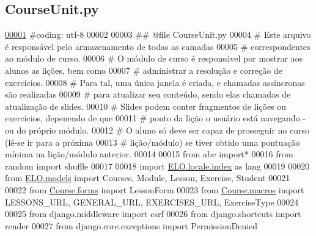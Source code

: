 \hypertarget{CourseUnit_8py_source}{}\subsection{Course\+Unit.\+py}
\label{CourseUnit_8py_source}

\begin{DoxyCode}
\hypertarget{CourseUnit_8py_source_l00001}{}\hyperlink{namespaceCourse_1_1CourseUnit}{00001} \textcolor{comment}{#coding: utf-8}
00002 
00003 \textcolor{comment}{## @file CourseUnit.py}
00004 \textcolor{comment}{#   Este arquivo é responsável pelo armazenamento de todas as camadas }
00005 \textcolor{comment}{# correspondentes ao módulo de curso. }
00006 \textcolor{comment}{#   O módulo de curso é responsável por mostrar aos alunos as lições, bem como}
00007 \textcolor{comment}{# administrar a resolução e correção de exercícios.}
00008 \textcolor{comment}{#   Para tal, uma única janela é criada, e chamadas assíncronas são realizadas}
00009 \textcolor{comment}{# para atualizar seu conteúdo, sendo elas chamadas de atualização de slides.}
00010 \textcolor{comment}{#   Slides podem conter fragmentos de lições ou exercícios, depenendo de que}
00011 \textcolor{comment}{# ponto da lição o usuário está navegando - ou do próprio módulo.}
00012 \textcolor{comment}{#   O aluno só deve ser capaz de prosseguir no curso (lê-se ir para a próxima}
00013 \textcolor{comment}{# lição/módulo) se tiver obtido uma pontuação mínima na lição/módulo anterior.}
00014 
00015 \textcolor{keyword}{from} abc \textcolor{keyword}{import}*
00016 \textcolor{keyword}{from} random \textcolor{keyword}{import} shuffle
00017 
00018 \textcolor{keyword}{import} \hyperlink{namespaceELO_1_1locale_1_1index}{ELO.locale.index} \textcolor{keyword}{as} lang
00019 
00020 \textcolor{keyword}{from} \hyperlink{namespaceELO_1_1models}{ELO.models} \textcolor{keyword}{import} Courses, Module, Lesson, Exercise, Student
00021 
00022 \textcolor{keyword}{from} \hyperlink{namespaceCourse_1_1forms}{Course.forms} \textcolor{keyword}{import} LessonForm
00023 \textcolor{keyword}{from} \hyperlink{namespaceCourse_1_1macros}{Course.macros} \textcolor{keyword}{import} LESSONS\_URL, GENERAL\_URL, EXERCISES\_URL, ExerciseType
00024 
00025 \textcolor{keyword}{from} django.middleware \textcolor{keyword}{import} csrf
00026 \textcolor{keyword}{from} django.shortcuts \textcolor{keyword}{import} render
00027 \textcolor{keyword}{from} django.core.exceptions \textcolor{keyword}{import} PermissionDenied

\end{DoxyCode}
